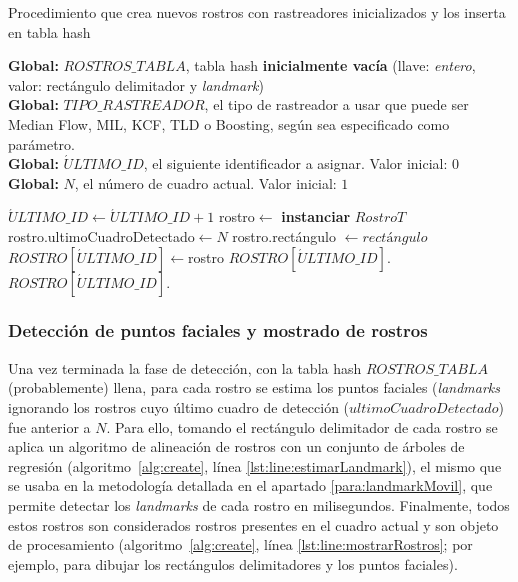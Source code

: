 \documentclass[a4paper,openright,12pt]{report}
\begin{document}
\begin{algorithm}
  \caption{Procedimiento que crea nuevos rostros con rastreadores inicializados
           y los inserta en tabla hash}
  \label{alg:create}
  \textbf{Global: }$ROSTROS\_TABLA$, tabla hash \textbf{inicialmente vacía}
      (llave: \textit{entero}, valor: rectángulo delimitador y \textit{landmark})\\
  \textbf{Global: }$TIPO\_RASTREADOR$, el tipo de rastreador a usar que puede
                                       ser Median Flow, MIL, KCF, TLD o
                                       Boosting, según sea especificado como
                                       parámetro.\\
  \textbf{Global: }$\acute{U}LTIMO\_ID$, el siguiente identificador a asignar. Valor inicial: $0$\\
  \textbf{Global: }$N$, el número de cuadro actual. Valor inicial: $1$\\
  \begin{algorithmic}[1]
        \State $\acute{U}LTIMO\_ID\gets \acute{U}LTIMO\_ID + 1$
        \label{lst:line:createRastrearActualizarUltimoFrame}
        \State rostro$\gets$ \textbf{instanciar} $RostroT$
        \label{lst:line:createBeginNewStruct}
        \State rostro.ultimoCuadroDetectado$\gets N$
        \State rostro.rectángulo $\gets rectángulo$
        \State $ROSTRO[\acute{U}LTIMO\_ID]\gets$rostro
        \State $ROSTRO[\acute{U}LTIMO\_ID].$
        \State $ROSTRO[\acute{U}LTIMO\_ID].$
        \label{lst:line:createEndNewStruct}
      \EndFor
    \EndProcedure
  \end{algorithmic}
\end{algorithm}

\subsubsection{Detección de puntos faciales y mostrado de rostros} \label{sssec:landmark}
Una vez terminada la fase de detección, con la tabla hash $ROSTROS\_TABLA$
(probablemente) llena, para cada rostro se estima los puntos faciales
(\textit{\glspl{landmark}} ignorando los rostros cuyo último cuadro de detección
($ultimoCuadroDetectado$) fue anterior a $N$. Para ello, tomando el rectángulo
delimitador de cada rostro se aplica un algoritmo de alineación de
rostros con un conjunto de árboles de regresión (algoritmo~\ref{alg:create},
línea \ref{lst:line:estimarLandmark}), el mismo que se usaba en la metodología
detallada en el apartado \ref{para:landmarkMovil}, que permite detectar
los \textit{\glspl{landmark}} de cada rostro en milisegundos. Finalmente, todos estos
rostros son considerados rostros presentes en el cuadro actual y son objeto de
procesamiento (algoritmo~\ref{alg:create}, línea \ref{lst:line:mostrarRostros};
por ejemplo, para dibujar los rectángulos delimitadores y los puntos faciales).
\end{document}
